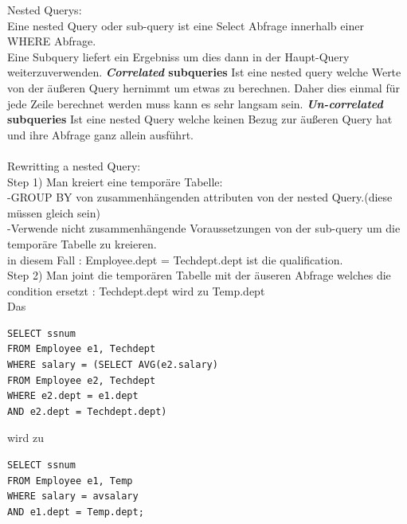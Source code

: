 \documentclass[12pt]{article}\pagestyle{myheadings}
\theoremstyle{plain}
\begin{document}
\begin{enumerate}
Nested Querys:\\
Eine nested Query oder sub-query ist eine Select Abfrage innerhalb einer WHERE Abfrage.\\
Eine Subquery liefert ein Ergebniss um dies dann in der Haupt-Query weiterzuverwenden.
\textbf{\textit{Correlated} subqueries}
Ist eine nested query welche Werte von der äußeren Query hernimmt um etwas zu berechnen.
Daher dies einmal für jede Zeile berechnet werden muss kann es sehr langsam sein.
\textbf{\textit{Un-correlated} subqueries} 
Ist eine nested Query welche keinen Bezug zur äußeren Query hat und ihre Abfrage ganz allein  ausführt.\\ \\
Rewritting a nested Query:\\
Step 1) Man kreiert eine temporäre Tabelle:\\-GROUP BY von zusammenhängenden attributen von der nested Query.(diese müssen gleich sein)\\
-Verwende nicht zusammenhängende Voraussetzungen von der sub-query um die temporäre Tabelle zu kreieren.\\
in diesem Fall : Employee.dept = Techdept.dept ist die qualification.\\
Step 2) Man joint die temporären Tabelle mit der äuseren Abfrage welches die condition ersetzt : Techdept.dept wird zu Temp.dept\\
Das \begin{verbatim}
SELECT ssnum
FROM Employee e1, Techdept
WHERE salary = (SELECT AVG(e2.salary)
FROM Employee e2, Techdept
WHERE e2.dept = e1.dept
AND e2.dept = Techdept.dept)
\end{verbatim}
wird zu
\begin{verbatim}
SELECT ssnum
FROM Employee e1, Temp
WHERE salary = avsalary
AND e1.dept = Temp.dept;
\end{verbatim}


\end{enumerate}
\end{document}
